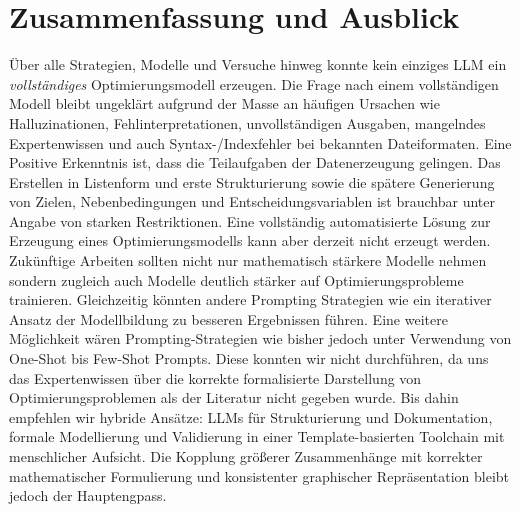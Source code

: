 \documentclass[runningheads]{llncs}
\begin{document}
\section{Zusammenfassung und Ausblick}

Über alle Strategien, Modelle und Versuche hinweg konnte kein einziges LLM ein \emph{vollständiges} Optimierungsmodell erzeugen. Die Frage nach einem vollständigen Modell bleibt ungeklärt aufgrund der Masse an häufigen Ursachen wie Halluzinationen, Fehlinterpretationen, unvollständigen Ausgaben, mangelndes Expertenwissen und auch Syntax-/Indexfehler bei bekannten Dateiformaten. 
Eine Positive Erkenntnis ist, dass die Teilaufgaben der Datenerzeugung gelingen. Das Erstellen in Listenform und erste Strukturierung sowie die spätere Generierung von Zielen, Nebenbedingungen und Entscheidungsvariablen ist brauchbar unter Angabe von starken Restriktionen. Eine vollständig automatisierte Lösung zur Erzeugung eines Optimierungsmodells kann aber derzeit nicht erzeugt werden. Zukünftige Arbeiten sollten nicht nur mathematisch stärkere Modelle nehmen sondern zugleich auch Modelle deutlich stärker auf Optimierungsprobleme trainieren. Gleichzeitig könnten andere Prompting Strategien wie ein iterativer Ansatz der Modellbildung zu besseren Ergebnissen führen. Eine weitere Möglichkeit wären Prompting-Strategien wie bisher jedoch unter Verwendung von One-Shot bis Few-Shot Prompts. Diese konnten wir nicht durchführen, da uns das Expertenwissen über die korrekte formalisierte Darstellung von Optimierungsproblemen als der Literatur nicht gegeben wurde. Bis dahin empfehlen wir hybride Ansätze: LLMs für Strukturierung und Dokumentation, formale Modellierung und Validierung in einer Template-basierten Toolchain mit menschlicher Aufsicht. Die Kopplung größerer Zusammenhänge mit korrekter mathematischer Formulierung und konsistenter graphischer Repräsentation bleibt jedoch der Hauptengpass.
\\

\end{document}

